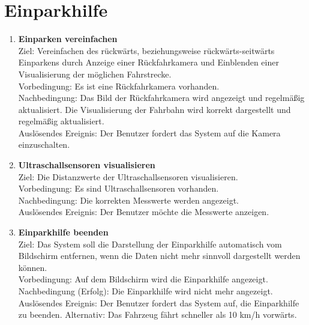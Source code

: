 \documentclass[pflichtenheft.tex]{subfiles}
\begin{document}
	\section{Einparkhilfe}
	
	\begin{enumerate}
	\setcounter{enumi}{\value{enumTemp}}

	\item{\textbf{Einparken vereinfachen}} \\ Ziel: Vereinfachen des rückwärts, beziehungsweise rückwärts-seitwärts Einparkens durch Anzeige einer Rückfahrkamera und Einblenden einer Visualisierung der möglichen Fahrstrecke. \\
	Vorbedingung: Es ist eine Rückfahrkamera vorhanden. \\ Nachbedingung: Das Bild der Rückfahrkamera wird angezeigt und regelmäßig aktualisiert. Die Visualisierung der Fahrbahn wird korrekt dargestellt und regelmäßig aktualisiert.\\
	Auslösendes Ereignis: Der Benutzer fordert das System auf die Kamera einzuschalten. 

	\item{\textbf{Ultraschallsensoren visualisieren}} \label{ultrasound} \\ Ziel: Die Distanzwerte der Ultraschallsensoren visualisieren. 		\\ Vorbedingung: Es sind Ultraschallsensoren vorhanden.\\
	Nachbedingung: Die korrekten Messwerte werden angezeigt.\\
	Auslösendes Ereignis: Der Benutzer möchte die Messwerte anzeigen.

	\item{\textbf{Einparkhilfe beenden}} \label{quit:passist} \\ Ziel: Das System soll die Darstellung der Einparkhilfe automatisch vom Bildschirm entfernen, wenn die Daten nicht mehr sinnvoll dargestellt werden können. \\ Vorbedingung: Auf dem Bildschirm wird die Einparkhilfe angezeigt. \\ Nachbedingung (Erfolg): Die Einparkhilfe wird nicht mehr angezeigt.\\
	Auslösendes Ereignis: Der Benutzer fordert das System auf, die Einparkhilfe zu beenden. Alternativ: Das Fahrzeug fährt schneller als 10 km/h vorwärts.

	\setcounter{enumTemp}{\value{enumi}}

	\end{enumerate}
	
\end{document}
